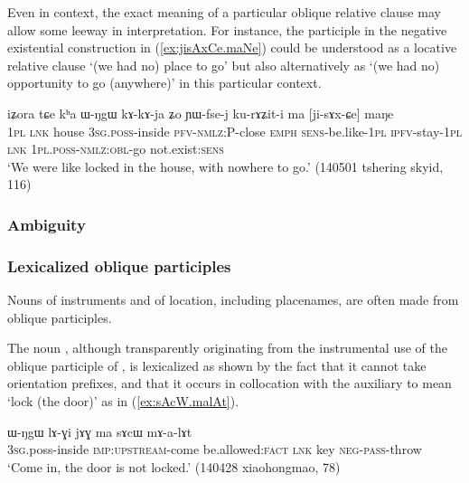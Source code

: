 Even in context, the exact meaning of a particular oblique relative clause may allow some leeway in interpretation. For instance, the participle  in the negative existential construction in (\ref{ex:jisAxCe.maNe}) could be understood as a locative relative clause `(we had no) place to go' but also alternatively as `(we had no) opportunity to go (anywhere)' in this particular context.

\begin{exe}
\ex \label{ex:jisAxCe.maNe}
\gll  iʑora tɕe kʰa ɯ-ŋgɯ kɤ-kɤ-ja ʑo ɲɯ-fse-j ku-rɤʑit-i ma [ji-sɤx-ɕe] maŋe \\
\textsc{1pl} \textsc{lnk} house \textsc{3sg}.\textsc{poss}-inside \textsc{pfv}-\textsc{nmlz}:P-close \textsc{emph} \textsc{sens}-be.like-\textsc{1pl} \textsc{ipfv}-stay-\textsc{1pl} \textsc{lnk} \textsc{1pl}.\textsc{poss}-\textsc{nmlz}:\textsc{obl}-go not.exist:\textsc{sens} \\
\glt  `We were like locked in the house, with nowhere to go.' (140501 tshering skyid, 116)
\end{exe}

\subsubsection{Ambiguity} \label{sec:oblique.participle.ambiguity}

\subsubsection{Lexicalized oblique participles} \label{sec:lexicalized.oblique.participle}
Nouns of instruments and of location, including placenames, are often made from oblique participles. 

The noun , although transparently originating from the instrumental use of the oblique participle of , is lexicalized as shown by the fact that it cannot take orientation prefixes, and that it occurs in collocation with the auxiliary  to mean `lock (the door)' as in (\ref{ex:sAcW.malAt}).

\begin{exe}
\ex \label{ex:sAcW.malAt}
\gll   ɯ-ŋgɯ lɤ-ɣi jɤɣ ma sɤcɯ mɤ-a-lɤt \\
\textsc{3sg}.poss-inside \textsc{imp}:\textsc{upstream}-come be.allowed:\textsc{fact} \textsc{lnk} key \textsc{neg}-\textsc{pass}-throw \\
\glt `Come in, the door is not locked.' (140428 xiaohongmao, 78)
\end{exe}

